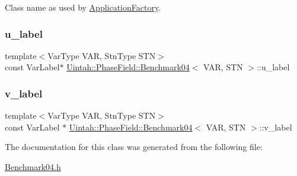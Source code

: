 Class name as used by \hyperlink{classUintah_1_1PhaseField_1_1ApplicationFactory}{Application\+Factory}. 

\mbox{\label{classUintah_1_1PhaseField_1_1Benchmark04_a440d44ec4e99753872e418be27bc445e}} 
\subsubsection{\texorpdfstring{u\+\_\+label}{u\_label}}
{\footnotesize\ttfamily template$<$Var\+Type V\+AR, Stn\+Type S\+TN$>$ \\
const Var\+Label$\ast$ \hyperlink{classUintah_1_1PhaseField_1_1Benchmark04}{Uintah\+::\+Phase\+Field\+::\+Benchmark04}$<$ V\+AR, S\+TN $>$\+::u\+\_\+label\hspace{0.3cm}{\ttfamily [protected]}}

\mbox{\label{classUintah_1_1PhaseField_1_1Benchmark04_adb064f99ad9fd107d25f571e800fce74}} 
\subsubsection{\texorpdfstring{v\+\_\+label}{v\_label}}
{\footnotesize\ttfamily template$<$Var\+Type V\+AR, Stn\+Type S\+TN$>$ \\
const Var\+Label $\ast$ \hyperlink{classUintah_1_1PhaseField_1_1Benchmark04}{Uintah\+::\+Phase\+Field\+::\+Benchmark04}$<$ V\+AR, S\+TN $>$\+::v\+\_\+label\hspace{0.3cm}{\ttfamily [protected]}}



The documentation for this class was generated from the following file\+:\begin{DoxyCompactItemize}
\item 
\hyperlink{Benchmark04_8h}{Benchmark04.\+h}\end{DoxyCompactItemize}
